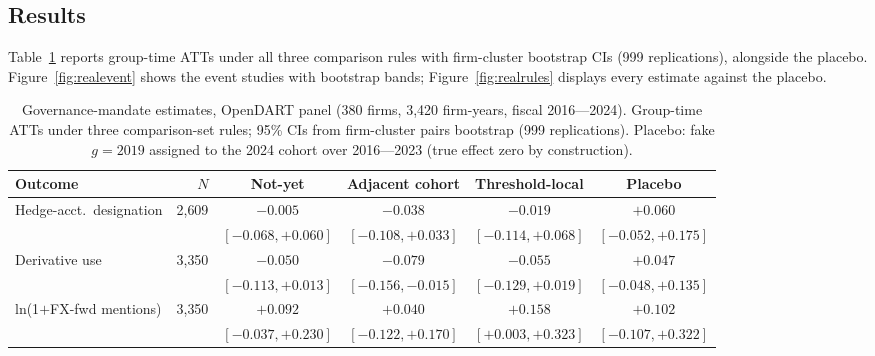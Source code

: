 \documentclass[11pt,a4paper]{article}
\begin{document}
\subsection{Results}
\label{sec:execresults}

Table~\ref{tab:realresults} reports group-time ATTs under all three comparison rules with firm-cluster bootstrap CIs (999 replications), alongside the placebo. Figure~\ref{fig:realevent} shows the event studies with bootstrap bands; Figure~\ref{fig:realrules} displays every estimate against the placebo.

\begin{table}[h]
\centering
\begin{tabular}{p{2.9cm}rcccc}
\toprule
Outcome & $N$ & Not-yet & Adjacent cohort & Threshold-local & Placebo \\
\midrule
Hedge-acct.\ designation & 2{,}609 & $-0.005$ & $-0.038$ & $-0.019$ & $+0.060$ \\
 & & {\scriptsize$[-0.068,+0.060]$} & {\scriptsize$[-0.108,+0.033]$} & {\scriptsize$[-0.114,+0.068]$} & {\scriptsize$[-0.052,+0.175]$} \\
Derivative use & 3{,}350 & $-0.050$ & $-0.079$ & $-0.055$ & $+0.047$ \\
 & & {\scriptsize$[-0.113,+0.013]$} & {\scriptsize$[-0.156,-0.015]$} & {\scriptsize$[-0.129,+0.019]$} & {\scriptsize$[-0.048,+0.135]$} \\
ln(1$+$FX-fwd mentions) & 3{,}350 & $+0.092$ & $+0.040$ & $+0.158$ & $+0.102$ \\
 & & {\scriptsize$[-0.037,+0.230]$} & {\scriptsize$[-0.122,+0.170]$} & {\scriptsize$[+0.003,+0.323]$} & {\scriptsize$[-0.107,+0.322]$} \\
\bottomrule
\end{tabular}
\caption{Governance-mandate estimates, OpenDART panel (380 firms, 3{,}420 firm-years, fiscal 2016---2024). Group-time ATTs under three comparison-set rules; 95\% CIs from firm-cluster pairs bootstrap (999 replications). Placebo: fake $g{=}2019$ assigned to the 2024 cohort over 2016---2023 (true effect zero by construction).}
\label{tab:realresults}
\end{table}
\end{document}
